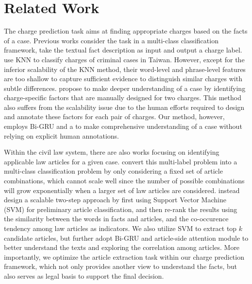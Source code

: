 \section{Related Work}
\label{sec_related_work}
The charge prediction task aims at finding appropriate charges based on the facts of a case. Previous works consider the task in a multi-class classification framework, take the textual fact description as input and output a charge label. 
\cite{LIU2004case,liu2006exploring} use KNN to classify charges of criminal cases in Taiwan. However, except for the inferior scalability of the KNN method, their word-level and phrase-level features are too shallow to capture  sufficient evidence to distinguish similar charges with subtle differences. 
\cite{lin2012exploiting} propose to make deeper understanding of a case by identifying charge-specific factors that are manually designed for two charges. This method also suffers from the scalability issue due to the human efforts required to design and annotate these factors for each pair of charges. Our method, however, employs Bi-GRU and a  to make comprehensive understanding of a case without relying on explicit human annotations. 

Within the civil law system,
there are also works focusing on identifying applicable law articles for a given case. 
\cite{liu2005classifying,liu2006exploring} convert this multi-label problem into a multi-class classification problem by only considering a fixed set of article combinations, which cannot scale well since the number of possible combinations will grow exponentially when a larger set of 
law articles are considered.
\cite{liu2015predicting} instead design a scalable two-step approach %
by first using Support Vector Machine (SVM) for preliminary article classification, and then 
re-rank the results using the similarity between the words in facts and articles, and the co-occurence tendency among law articles as indicators.
We also utilize SVM to extract top $k$ candidate articles, but further adopt Bi-GRU and article-side attention module to better understand the texts and exploring the correlation among articles. 
More importantly, we optimize the article extraction task within our charge prediction framework,  which not only provides another view to understand the facts, but also serves as legal basis to support the final decision.

